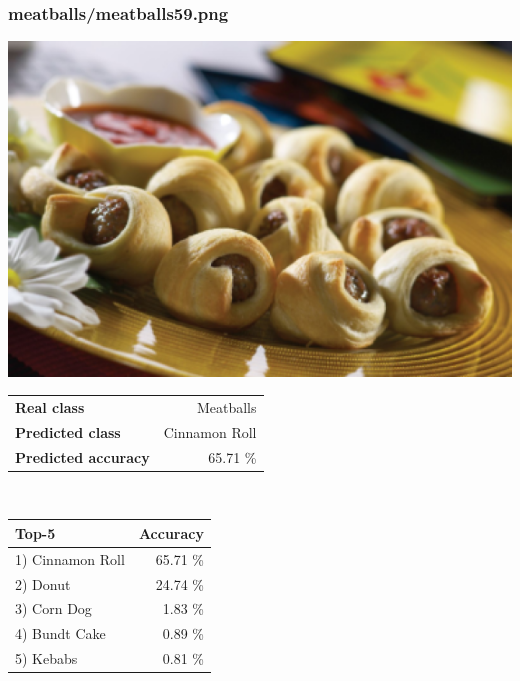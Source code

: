\subsubsection{meatballs/meatballs59.png}

\begin{minipage}[t]{0.4\textwidth}
	\vspace{0pt}
	\includegraphics[width=\linewidth]{images/evaluation-images/meatballs/meatballs59.png}
\end{minipage}
\hfill
\begin{minipage}[t]{0.5\textwidth}
	\vspace{0pt}\raggedright
	\begin{tabularx}{\textwidth}{X r}
		\small \textbf{Real class} & \small Meatballs\\
		\small \textbf{Predicted class} & \small Cinnamon Roll\\
		\small \textbf{Predicted accuracy} & \small 65.71 \%
    \end{tabularx}\\
    
    \vspace{6pt}
	\begin{tabularx}{\textwidth}{X r}
        \small \textbf{Top-5} & \small \textbf{Accuracy} \\
        \hline
		\small 1) Cinnamon Roll & \small 65.71 \%\\\small 2) Donut & \small 24.74 \%\\\small 3) Corn Dog & \small 1.83 \%\\\small 4) Bundt Cake & \small 0.89 \%\\\small 5) Kebabs & \small 0.81 \%
    \end{tabularx}
\end{minipage}
    
